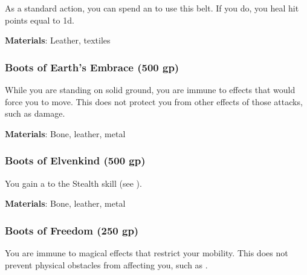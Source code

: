 As a standard action, you can spend an  to use this belt.
If you do, you heal hit points equal to  \plus1d.



\vspace{0.25em}
\textbf{Materials}: Leather, textiles


\lowercase{\hypertarget{item:Boots of Earth's Embrace}{}}\label{item:Boots of Earth's Embrace}
\hypertarget{item:Boots of Earth's Embrace}{\subsubsection{Boots of Earth's Embrace\hfill{} (500 gp)}}

While you are standing on solid ground, you are immune to effects that would force you to move.
This does not protect you from other effects of those attacks, such as damage.



\vspace{0.25em}
\textbf{Materials}: Bone, leather, metal


\lowercase{\hypertarget{item:Boots of Elvenkind}{}}\label{item:Boots of Elvenkind}
\hypertarget{item:Boots of Elvenkind}{\subsubsection{Boots of Elvenkind\hfill{} (500 gp)}}

You gain a   to the Stealth skill (see ).



\vspace{0.25em}
\textbf{Materials}: Bone, leather, metal


\lowercase{\hypertarget{item:Boots of Freedom}{}}\label{item:Boots of Freedom}
\hypertarget{item:Boots of Freedom}{\subsubsection{Boots of Freedom\hfill{} (250 gp)}}

You are immune to magical effects that restrict your mobility.
This does not prevent physical obstacles from affecting you, such as .



